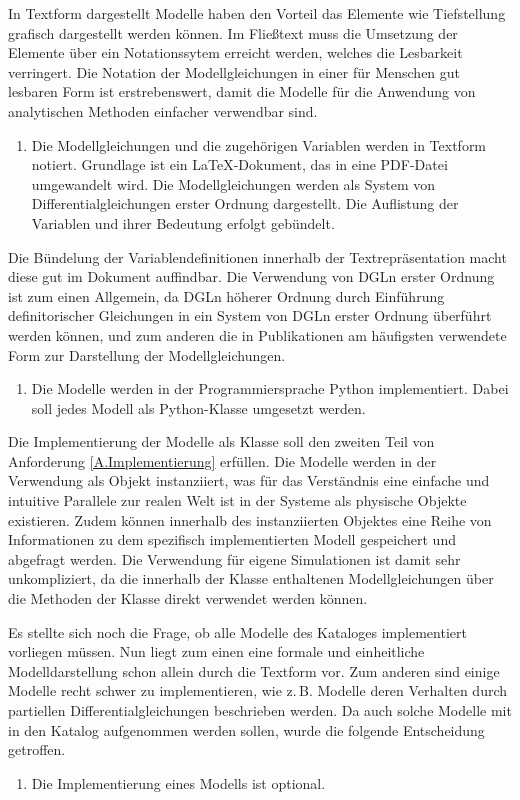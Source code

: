 In Textform dargestellt Modelle haben den Vorteil das Elemente wie Tiefstellung grafisch dargestellt werden können. Im Fließtext muss die Umsetzung der Elemente über ein Notationssytem erreicht werden, welches die Lesbarkeit verringert. Die Notation der Modellgleichungen in einer für Menschen gut lesbaren Form ist erstrebenswert, damit die Modelle für die Anwendung von analytischen Methoden einfacher verwendbar sind. 
\begin{enumerate}[resume*]
	\item \label{E.Textdok}Die Modellgleichungen und die zugehörigen Variablen werden in Textform notiert. Grundlage ist ein \LaTeX-Dokument, das in eine PDF-Datei umgewandelt wird. Die Modellgleichungen werden als System von Differentialgleichungen erster Ordnung dargestellt. Die Auflistung der Variablen und ihrer Bedeutung erfolgt gebündelt.
\end{enumerate}
Die Bündelung der Variablendefinitionen innerhalb der Textrepräsentation macht diese gut im Dokument auffindbar. Die Verwendung von DGLn erster Ordnung ist zum einen Allgemein, da DGLn höherer Ordnung durch Einführung definitorischer Gleichungen in ein System von DGLn erster Ordnung überführt werden können, und zum anderen die in Publikationen am häufigsten verwendete Form zur Darstellung der Modellgleichungen.

\begin{enumerate}[resume*]
	\item \label{E.Implementation}Die Modelle werden in der Programmiersprache Python implementiert. Dabei soll jedes Modell als Python-Klasse umgesetzt werden.
\end{enumerate}
Die Implementierung der Modelle als Klasse soll den zweiten Teil von Anforderung \ref{A.Implementierung} erfüllen. Die Modelle werden in der Verwendung als Objekt instanziiert, was für das Verständnis eine einfache und intuitive Parallele zur realen Welt ist in der Systeme als physische Objekte existieren. Zudem können innerhalb des instanziierten Objektes eine Reihe von Informationen zu dem spezifisch implementierten Modell gespeichert und abgefragt werden. Die Verwendung für eigene Simulationen ist damit sehr unkompliziert, da die innerhalb der Klasse enthaltenen Modellgleichungen über die Methoden der Klasse direkt verwendet werden können.

Es stellte sich noch die Frage, ob alle Modelle des Kataloges implementiert vorliegen müssen. Nun liegt zum einen eine formale und einheitliche Modelldarstellung schon allein durch die Textform vor. Zum anderen sind einige Modelle recht schwer zu implementieren, wie z.\,B. Modelle deren Verhalten durch partiellen Differentialgleichungen beschrieben werden. Da auch solche Modelle mit in den Katalog aufgenommen werden sollen, wurde die folgende Entscheidung getroffen.
\begin{enumerate}[resume*]
	\item \label{E.ImplementierungOptional}Die Implementierung eines Modells ist optional.
\end{enumerate}

